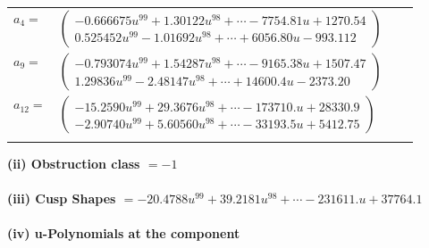 \documentclass[1p]{elsarticle_modified}
\theoremstyle{definition}
\begin{document}
\begin{tabular}{m{7pt} m{180pt} m{7pt} m{180pt} }
\flushright $a_{4}=$&$\begin{pmatrix}-0.666675 u^{99}+1.30122 u^{98}+\cdots-7754.81 u+1270.54\\0.525452 u^{99}-1.01692 u^{98}+\cdots+6056.80 u-993.112\end{pmatrix}$ \\
\flushright $a_{9}=$&$\begin{pmatrix}-0.793074 u^{99}+1.54287 u^{98}+\cdots-9165.38 u+1507.47\\1.29836 u^{99}-2.48147 u^{98}+\cdots+14600.4 u-2373.20\end{pmatrix}$ \\
\flushright $a_{12}=$&$\begin{pmatrix}-15.2590 u^{99}+29.3676 u^{98}+\cdots-173710. u+28330.9\\-2.90740 u^{99}+5.60560 u^{98}+\cdots-33193.5 u+5412.75\end{pmatrix}$\\&\end{tabular}
\flushleft \textbf{(ii) Obstruction class $= -1$}\\~\\
\flushleft \textbf{(iii) Cusp Shapes $= -20.4788 u^{99}+39.2181 u^{98}+\cdots-231611. u+37764.1$}\\~\\
\newpage\renewcommand{\arraystretch}{1}
\flushleft \textbf{(iv) u-Polynomials at the component}\newline \\
\end{document}
